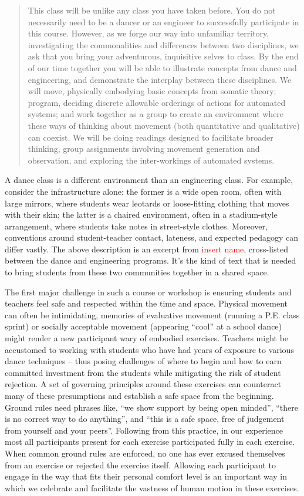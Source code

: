 \documentclass[arts,article,submit,moreauthors,pdftex,10pt,a4paper]{mdpi}
\begin{document}
\begin{quote}
This class will be unlike any class you have taken before. You do not necessarily need to be a dancer or an engineer to successfully participate in this course. However, as we forge our way into unfamiliar territory, investigating the commonalities and differences between two disciplines, we ask that you bring your adventurous, inquisitive selves to class. By the end of our time together you will be able to illustrate concepts from dance and engineering, and demonstrate the interplay between these disciplines. We will move, physically embodying basic concepts from somatic theory; program, deciding discrete allowable orderings of actions for automated systems; and work together as a group to create an environment where these ways of thinking about movement (both quantitative and qualitative) can coexist. We will be doing readings designed to facilitate broader thinking, group assignments involving movement generation and observation, and exploring the inter-workings of automated systems.
\end{quote}

A dance class is a different environment than an engineering class.  For example, consider the infrastructure alone: the former is a wide open room, often with large mirrors, where students wear leotards or loose-fitting clothing that moves with their skin; the latter is a chaired environment, often in a stadium-style arrangement, where students take notes in street-style clothes.  Moreover, conventions around student-teacher contact, lateness, and expected pedagogy can differ vastly.  The above description is an excerpt from  \textcolor{red}{insert name}, cross-listed between the dance and engineering programs.  It's the kind of text that is needed to bring students from these two communities together in a shared space.

The first major challenge in such a course or workshop is ensuring students and teachers feel safe and respected within the time and space.  Physical movement can often be intimidating, memories of evaluative movement (running a P.E. class sprint) or socially acceptable movement (appearing ``cool'' at a school dance) might render a new participant wary of embodied exercises.  Teachers might be accustomed to working with students who have had years of exposure to various dance techniques -- thus posing challenges of where to begin and how to earn committed investment from the students while mitigating the risk of student rejection.  A set of governing principles around these exercises can counteract many of these presumptions and establish a safe space from the beginning.  Ground rules need phrases like, “we show support by being open minded”, “there is no correct way to do anything”, and “this is a safe space, free of judgement from yourself and your peers”.  Following from this practice, in our experience most all participants present for each exercise participated fully in each exercise.  When common ground rules are enforced, no one has ever excused themselves from an exercise or rejected the exercise itself.  Allowing each participant to engage in the way that fits their personal comfort level is an important way in which we celebrate and facilitate the vastness of human motion in these exercises.
\end{document}
